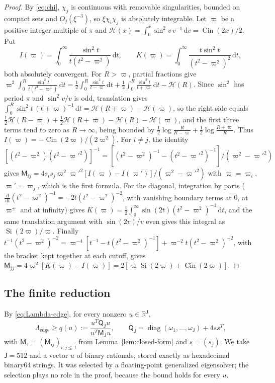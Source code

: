 \documentclass{siamart251216}
\newcommand{\R}{\mathbb R}
\newcommand{\dd}{\,\mathrm d}
\begin{document}
\begin{proof}
By \eqref{eq:chi}, $\chi_j$ is continuous with removable singularities,
bounded on compact sets and $O_j(\xi^{-3})$, so $\xi\chi_i\chi_j$ is
absolutely integrable. Let $\varpi$ be a positive integer multiple of $\pi$ and
$\mathcal H(x)=\int_0^x\sin^2v\,v^{-1}\dd v=\operatorname{Cin}(2x)/2$. Put
\[
 I(\varpi)=\int_0^\infty\frac{\sin^2t}{t(t^2-\varpi^2)}\dd t,\qquad
 K(\varpi)=\int_0^\infty\frac{t\sin^2t}{(t^2-\varpi^2)^2}\dd t ,
\]
both absolutely convergent. For $R>\varpi$, partial fractions give
$\varpi^2\int_0^R\frac{\sin^2t}{t(t^2-\varpi^2)}\dd t=\frac12\int_0^R\frac{\sin^2t}{t-\varpi}\dd t
+\frac12\int_0^R\frac{\sin^2t}{t+\varpi}\dd t-\mathcal H(R)$. Since $\sin^2$ has
period $\pi$ and $\sin^2v/v$ is odd, translation gives
$\int_0^R\sin^2t\,(t\mp \varpi)^{-1}\dd t=\mathcal H(R\mp \varpi)-\mathcal H(\varpi)$, so
the right side equals $\frac12\mathcal H(R-\varpi)+\frac12\mathcal H(R+\varpi)-\mathcal H(R)-\mathcal H(\varpi)$,
and the first three terms tend to zero as $R\to\infty$, being bounded by
$\frac12\log\frac R{R-\varpi}+\frac12\log\frac{R+\varpi}R$. Thus
$I(\varpi)=-\operatorname{Cin}(2\varpi)/(2\varpi^2)$. For $i\ne j$, the identity
$[(t^2-\varpi^2)(t^2-\varpi'^2)]^{-1}=[(t^2-\varpi^2)^{-1}-(t^2-\varpi'^2)^{-1}]/(\varpi^2-\varpi'^2)$ gives
$\mathsf M_{ij}=4s_is_j\varpi^2\varpi'^2[I(\varpi)-I(\varpi')]/(\varpi^2-\varpi'^2)$ with $\varpi=\varpi_i$, $\varpi'=\varpi_j$, which is
the first formula. For the diagonal, integration by parts
($\frac{\dd}{\dd t}(t^2-\varpi^2)^{-1}=-2t(t^2-\varpi^2)^{-2}$, with vanishing boundary
terms at $0$, at $\varpi^\pm$ and at infinity) gives
$K(\varpi)=\frac12\int_0^\infty\sin(2t)(t^2-\varpi^2)^{-1}\dd t$, and the same
translation argument with $\sin(2v)/v$ even gives this integral as
$\operatorname{Si}(2\varpi)/\varpi$. Finally
$t^{-1}(t^2-\varpi^2)^{-2}=\varpi^{-4}[t^{-1}-t(t^2-\varpi^2)^{-1}]+\varpi^{-2}t(t^2-\varpi^2)^{-2}$,
with the bracket kept together at each cutoff, gives
$\mathsf M_{jj}=4\varpi^2[K(\varpi)-I(\varpi)]=2[\varpi\operatorname{Si}(2\varpi)+\operatorname{Cin}(2\varpi)]$.
\end{proof}

\subsection{The finite reduction}

By \eqref{eq:Lambda-edge}, for every nonzero $u\in\R^{\mathsf J}$,
\[
 \Lambda_{\mathrm{edge}}\ge q(u):=\frac{u^T\mathsf Q_{\mathsf J}u}{u^T\mathsf M_{\mathsf J}u},\qquad
 \mathsf Q_{\mathsf J}=\operatorname{diag}(\omega_1,\dots,\omega_{\mathsf J})+4ss^T,
\]
with $\mathsf M_{\mathsf J}=(\mathsf M_{ij})_{i,j\le\mathsf J}$ from Lemma~\ref{lem:closed-form} and
$s=(s_j)$. We take $\mathsf J=512$ and a vector $u$ of binary rationals, stored
exactly as hexadecimal binary64 strings. It was selected by a floating-point
generalized eigensolver; the selection plays no role in the proof, because
the bound holds for every $u$.
\end{document}
